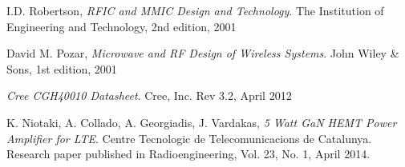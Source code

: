 

  \begin{thebibliography}{9}

		  I.D. Robertson, \emph{RFIC and MMIC Design and Technology}.
		  The Institution of Engineering and Technology,
		  2nd edition,
		  2001

		  David M. Pozar, \emph{Microwave and RF Design of Wireless Systems}.
		  John Wiley \& Sons,
		  1st edition,
		  2001

		  \emph{Cree CGH40010 Datasheet}.
		  Cree, Inc. 
		  Rev 3.2,
		  April 2012

		  K. Niotaki, A. Collado, A. Georgiadis, J. Vardakas, \emph{5 Watt GaN HEMT Power Amplifier for LTE}.
		  Centre Tecnologic de Telecomunicacions de Catalunya.
		  Research paper published in Radioengineering, Vol. 23, No. 1, April 2014.		  

  \end{thebibliography}
